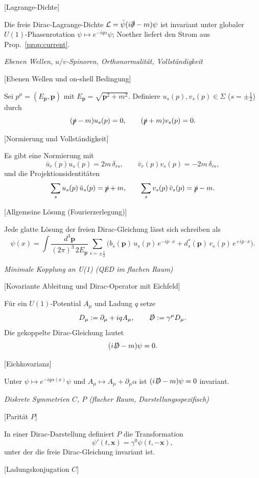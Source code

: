 \documentclass[10pt, letterpaper]{article}
\begin{document}
[Lagrange-Dichte]

Die freie Dirac-Lagrange-Dichte 
\(
\mathcal L = \bar\psi (i\slashed{\partial}-m)\psi
\)
ist invariant unter globaler $U(1)$-Phasenrotation $\psi\mapsto e^{-iq\alpha}\psi$; Noether liefert den Strom aus Prop.~\ref{prop:current}.


\emph{Ebenen Wellen, $u/v$-Spinoren, Orthonormalit\"at, Vollst\"andigkeit}

[Ebenen Wellen und on-shell Bedingung]

Sei $p^\mu=(E_{\mathbf p},\mathbf p)$ mit $E_{\mathbf p}=\sqrt{\mathbf p^2+m^2}$. Definiere $u_s(p),v_s(p)\in\Sigma$ ($s=\pm\frac12$) durch
\[
(\slashed p - m)u_s(p)=0,\qquad (\slashed p + m)v_s(p)=0.
\]


[Normierung und Vollst\"andigkeit]

Es gibt eine Normierung mit
\[
\bar u_r(p)u_s(p)=2m\,\delta_{rs},\qquad \bar v_r(p)v_s(p)=-2m\,\delta_{rs},
\]
und die Projektionsidentitäten
\[
\sum_{s} u_s(p)\,\bar u_s(p)=\slashed p + m,\qquad 
\sum_{s} v_s(p)\,\bar v_s(p)=\slashed p - m.
\]


[Allgemeine L\"osung (Fourierzerlegung)]

Jede glatte Lösung der freien Dirac-Gleichung lässt sich schreiben als
\[
\psi(x)=\int \frac{d^3\mathbf p}{(2\pi)^3\,2E_{\mathbf p}} 
\sum_{s=\pm\frac12}\big( b_s(\mathbf p)\,u_s(p)\,e^{-ip\cdot x} + d_s^\ast(\mathbf p)\,v_s(p)\,e^{+ip\cdot x}\big).
\]


\emph{Minimale Kopplung an U(1) (QED im flachen Raum)}

[Kovariante Ableitung und Dirac-Operator mit Eichfeld]

Für ein $U(1)$-Potential $A_\mu$ und Ladung $q$ setze
\[
D_\mu := \partial_\mu + i q A_\mu,\qquad \slashed{D}:=\gamma^\mu D_\mu.
\]
Die gekoppelte Dirac-Gleichung lautet
\[
(i\slashed{D}-m)\psi=0.
\]



[Eichkovarianz]

Unter $\psi\mapsto e^{-iq\alpha(x)}\psi$ und $A_\mu\mapsto A_\mu+\partial_\mu \alpha$ ist $(i\slashed D - m)\psi=0$ invariant.


\emph{Diskrete Symmetrien $C$, $P$ (flacher Raum, Darstellungsspezifisch)}

[Parit\"at $P$]

In einer Dirac-Darstellung definiert $P$ die Transformation 
\[
\psi'(t,\mathbf x)=\gamma^0 \psi(t,-\mathbf x),
\]
unter der die freie Dirac-Gleichung invariant ist.


[Ladungskonjugation $C$]
\end{document}
